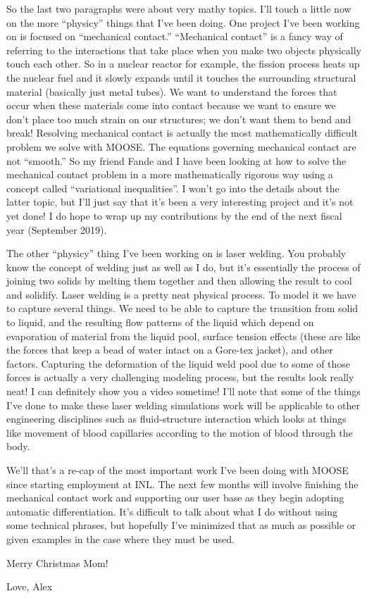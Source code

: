 \documentclass[11pt]{article}
\begin{document}
So the last two paragraphs were about very mathy topics. I'll touch a little now
on the more ``physicy'' things that I've been doing. One project I've been
working on is focused on ``mechanical contact.'' ``Mechanical contact'' is a
fancy way of referring to the interactions that take place when you make two
objects physically touch each other. So in a nuclear reactor for example, the
fission process heats up the nuclear fuel and it slowly expands until it touches
the surrounding structural material (basically just metal tubes). We want to
understand the forces that occur when these materials come into contact because
we want to ensure we don't place too much strain on our structures; we don't
want them to bend and break! Resolving mechanical contact is actually the most
mathematically difficult problem we solve with MOOSE. The equations governing
mechanical contact are not ``smooth.'' So my friend Fande and I have been
looking at how to solve the mechanical contact problem in a more mathematically
rigorous way using a concept called ``variational inequalities''. I won't go
into the details about the latter topic, but I'll just say that it's been a very
interesting project and it's not yet done! I do hope to wrap up my contributions by
the end of the next fiscal year (September 2019).

The other ``physicy'' thing I've been working on is laser welding. You probably
know the concept of welding just as well as I do, but it's essentially the
process of joining two solids by melting them together and then allowing the
result to cool and solidify. Laser welding is a pretty neat physical process. To
model it we have to capture several things. We need to be able to capture the
transition from solid to liquid, and the resulting flow patterns of the liquid
which depend on evaporation of material from the liquid pool, surface tension
effects (these are like the forces that keep a bead of water intact on a
Gore-tex jacket), and other factors. Capturing the deformation of the liquid
weld pool due to some of those forces is actually a very challenging modeling
process, but the results look really neat! I can definitely show you a video
sometime! I'll note that some of the things I've done to make these laser
welding simulations work will be applicable to other engineering disciplines
such as fluid-structure interaction which looks at things like movement of blood
capillaries according to the motion of blood through the body.

We'll that's a re-cap of the most important work I've been doing with MOOSE since
starting employment at INL. The next few months will involve finishing the
mechanical contact work and supporting our user base as they begin adopting
automatic differentiation. It's difficult to talk about what I do without using
some technical phrases, but hopefully I've minimized that as much as possible or
given examples in the case where they must be used.

Merry Christmas Mom!

Love, Alex
\end{document}
